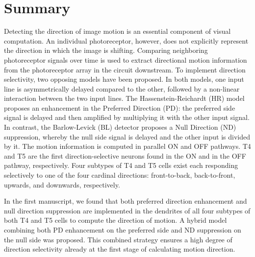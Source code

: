 
\begingroup
\let\clearpage\relax
\let\cleardoublepage\relax
\let\cleardoublepage\relax

\chapter*{Summary}

Detecting the direction of image motion is an essential component of visual computation. An individual photoreceptor, however, does not explicitly represent the direction in which the image is shifting. Comparing neighboring photoreceptor signals over time is used to extract directional motion information from the photoreceptor array in the circuit downstream. To implement direction selectivity, two opposing models have been proposed. In both models, one input line is asymmetrically delayed compared to the other, followed by a non-linear interaction between the two input lines. The Hassenstein-Reichardt (HR) model proposes an enhancement in the Preferred Direction (PD): the preferred side signal is delayed and then amplified by multiplying it with the other input signal. In contrast, the Barlow-Levick (BL) detector proposes a Null Direction (ND) suppression, whereby the null side signal is delayed and the other input is divided by it. The motion information is computed in parallel ON and OFF pathways. T4 and T5 are the first direction-selective neurons found in the ON and in the OFF pathway, respectively. Four subtypes of T4 and T5 cells exist each responding selectively to one of the four cardinal directions: front-to-back, back-to-front, upwards, and downwards, respectively.

In the first manuscript, we found that both preferred direction enhancement and null direction suppression are implemented in the dendrites of all four subtypes of both T4 and T5 cells to compute the direction of motion. A hybrid model combining both PD enhancement on the preferred side and ND suppression on the null side was proposed. This combined strategy ensures a high degree of direction selectivity already at the first stage of calculating motion direction. 

